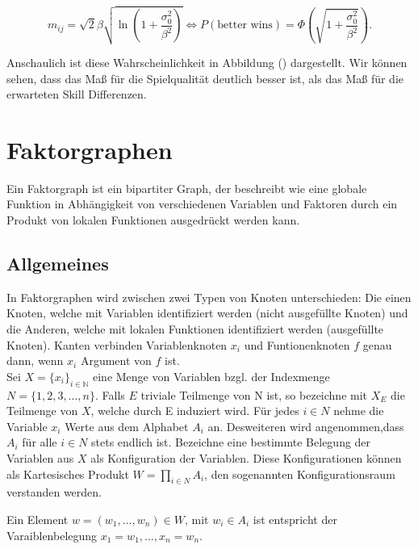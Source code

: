 \documentclass[12pt,a4paper]{scrartcl}
\numberwithin{equation}{section}
\newcommand{\N}{\mathbb{N}} %
\begin{document}
  \begin{equation}
   m_{ij} = \sqrt{2} \beta \sqrt{\ln(1 + \frac{\sigma_0^2}{\beta^2})} \Leftrightarrow P(\text{better wins}) = \Phi(\sqrt{1+ \frac{\sigma_0^2}{\beta^2}}).
  \end{equation}
  
  Anschaulich ist diese Wahrscheinlichkeit in Abbildung () dargestellt. Wir können sehen, dass das Maß für die Spielqualität deutlich besser ist, als das Maß für die erwarteten Skill 
  Differenzen. 




 \newpage  %

\section{Faktorgraphen}
Ein Faktorgraph ist ein bipartiter Graph, der beschreibt wie eine globale Funktion in Abhängigkeit von 
verschiedenen Variablen und Faktoren durch ein Produkt von lokalen Funktionen ausgedrückt werden kann.

\subsection{Allgemeines}
In Faktorgraphen wird zwischen zwei Typen von Knoten unterschieden: Die einen Knoten, welche mit Variablen 
identifiziert werden (nicht ausgefüllte Knoten) und die Anderen, welche mit lokalen Funktionen identifiziert werden 
(ausgefüllte Knoten).  Kanten verbinden Variablenknoten $x_{i}$ und Funtionenknoten $f$ genau dann, wenn 
$x_{i}$ Argument von $f$ ist. \\

Sei $X = \{ x_{i} \}_{i \in \N}$ eine Menge von Variablen bzgl. der Indexmenge $N = \{ 1,2,3,...,n \}$. 
Falls $E$ triviale Teilmenge von N ist, so bezeichne mit $X_{E}$ die Teilmenge von $X$, welche durch E induziert wird. 
Für jedes $ i \in N $ nehme die Variable $x_{i}$ Werte aus dem Alphabet $A_{i}$ an. Desweiteren wird angenommen,dass
$A_{i}$ für alle $i \in N$ stets endlich ist. Bezeichne eine bestimmte Belegung der Variablen aus $X$ als Konfiguration 
der Variablen. Diese Konfigurationen können als Kartesisches Produkt $W = \prod_{i \in N}A_{i}$, den sogenannten Konfigurationsraum
verstanden werden. 

Ein Element $w = (w_{1},...,w_{n}) \in W$, mit $w_{i} \in A_{i}$ ist entspricht der Varaiblenbelegung
$x_{1} = w_{1},...,x_{n} = w_{n} $. \\
\end{document}
